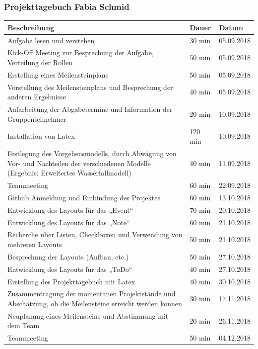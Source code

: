 \subsubsection{Projekttagebuch Fabia Schmid}
\begin{longtable}{|p{10cm}|p{2cm}|p{2cm}|}
\hline
{\textbf{Beschreibung}} & {\textbf{Dauer}} & {\textbf{Datum}} \\ \hline
Aufgabe lesen und verstehen & 30 min & 05.09.2018 \\ \hline
Kick-Off Meeting zur Besprechung der Aufgabe, Verteilung der Rollen & 50 min & 05.09.2018 \\ \hline
Erstellung eines Meilensteinplans & 50 min & 05.09.2018 \\ \hline
Vorstellung des Meilensteinplans und Besprechung der anderen Ergebnisse & 40 min & 05.09.2018 \\ \hline
Aufarbeitung der Abgabetermine und Information der Gruppenteilnehmer  & 20 min & 10.09.2018 \\ \hline
Installation von Latex & 120 min & 10.09.2018 \\ \hline
Festlegung des Vorgehensmodells, durch Abwägung von Vor- und Nachteilen der verschiedenen Modelle (Ergebnis: Erweitertes Wasserfallmodell)
 & 40 min & 11.09.2018 \\ \hline
Teammeeting & 60 min & 22.09.2018 \\ \hline
Github Anmeldung und Einbindung des Projektes & 60 min & 13.10.2018 \\ \hline
Entwicklung des Layouts für das „Event“  & 70 min & 20.10.2018 \\ \hline
Entwicklung des Layouts für das „Note“ & 60 min & 21.10.2018 \\ \hline
Recherche über Listen, Checkboxen und Verwendung von mehreren Layouts & 50 min & 21.10.2018 \\ \hline
Besprechung der Layouts (Aufbau, etc.) & 50 min & 27.10.2018 \\ \hline
Entwicklung des Layouts für das „ToDo“ & 40 min & 27.10.2018 \\ \hline
Erstellung des Projekttagebuch mit Latex & 40 min & 30.10.2018 \\ \hline
Zusammentragung der momentanen Projektstände und Abschätzung, ob die Meilensteine erreicht werden können & 30 min & 17.11.2018 \\ \hline
Neuplanung eines Meilensteins und Abstimmung mit dem Team & 20 min & 26.11.2018 \\ \hline
Teammeeting & 50 min & 04.12.2018 \\ \hline

\end{longtable}
